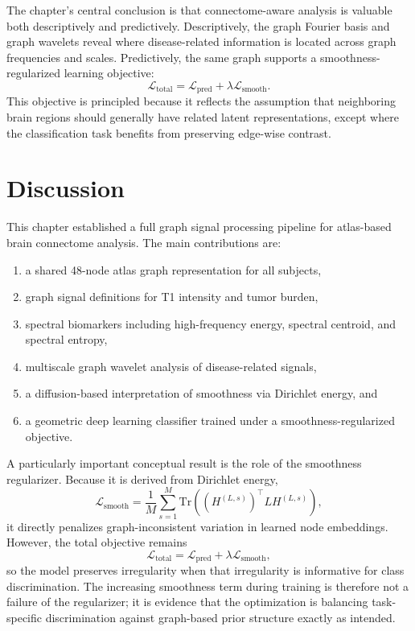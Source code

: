 The chapter's central conclusion is that connectome-aware analysis is valuable both descriptively and predictively. Descriptively, the graph Fourier basis and graph wavelets reveal where disease-related information is located across graph frequencies and scales. Predictively, the same graph supports a smoothness-regularized learning objective:
\[
\mathcal{L}_{\mathrm{total}}
=
\mathcal{L}_{\mathrm{pred}}
+
\lambda \mathcal{L}_{\mathrm{smooth}}.
\]
This objective is principled because it reflects the assumption that neighboring brain regions should generally have related latent representations, except where the classification task benefits from preserving edge-wise contrast.

\section{Discussion}
\label{sec:ch4_discussion} %

This chapter established a full graph signal processing pipeline for atlas-based brain connectome analysis. The main contributions are:
\begin{enumerate}[label=(\arabic*)] %
    \item a shared 48-node atlas graph representation for all subjects,
    \item graph signal definitions for T1 intensity and tumor burden,
    \item spectral biomarkers including high-frequency energy, spectral centroid, and spectral entropy,
    \item multiscale graph wavelet analysis of disease-related signals,
    \item a diffusion-based interpretation of smoothness via Dirichlet energy, and
    \item a geometric deep learning classifier trained under a smoothness-regularized objective.
\end{enumerate}

A particularly important conceptual result is the role of the smoothness regularizer. Because it is derived from Dirichlet energy,
\[
\mathcal{L}_{\mathrm{smooth}}
=
\frac{1}{M}\sum_{s=1}^{M}
\mathrm{Tr}\!\left((H^{(L,s)})^\top L H^{(L,s)}\right), %
\]
it directly penalizes graph-inconsistent variation in learned node embeddings. However, the total objective remains
\[
\mathcal{L}_{\mathrm{total}}
=
\mathcal{L}_{\mathrm{pred}}
+
\lambda \mathcal{L}_{\mathrm{smooth}},
\]
so the model preserves irregularity when that irregularity is informative for class discrimination. The increasing smoothness term during training is therefore not a failure of the regularizer; it is evidence that the optimization is balancing task-specific discrimination against graph-based prior structure exactly as intended.


